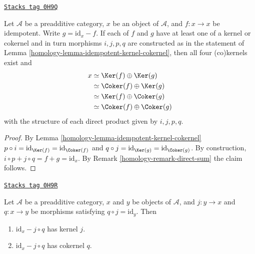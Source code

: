 \begin{lemma}
\label{homology-lemma-idempotent-splitting}
\href{https://stacks.math.columbia.edu/tag/0H9Q}{\texttt{Stacks tag 0H9Q}}

Let $\mathcal{A}$ be a preadditive category,
$x$ be an object of $\mathcal{A}$,
and $f : x \to x$ be idempotent.
Write $g = \text{id} _ x - f$.
If each of $f$ and $g$ have at least one of a kernel or cokernel
and in turn morphisms $i , j , p , q$ are constructed
as in the statement of Lemma \ref{homology-lemma-idempotent-kernel-cokernel},
then all four (co)kernels exist and
\begin{align*}
x
& \simeq \Ker (f) \oplus \Ker (g) \\
& \simeq \Coker (f) \oplus \Ker (g) \\
& \simeq \Ker (f) \oplus \Coker (g) \\
& \simeq \Coker (f) \oplus \Coker (g)
\end{align*}
with the structure of each direct product given by $i , j , p , q$.
\end{lemma}

\begin{proof}

By Lemma \ref{homology-lemma-idempotent-kernel-cokernel}
$p \circ i = \text{id} _ {\Ker (f)} = \text{id} _ {\Coker (f)}$
and $q \circ j = \text{id} _ {\Ker (g)} = \text{id} _ {\Coker (g)}$.
By construction, $i \circ p + j \circ q = f + g = \text{id} _ x$.
By Remark \ref{homology-remark-direct-sum} the claim follows.
\end{proof}

\begin{lemma}
\label{homology-lemma-split-morphism-kernel-cokernel}
\href{https://stacks.math.columbia.edu/tag/0H9R}{\texttt{Stacks tag 0H9R}}

Let $\mathcal{A}$ be a preadditive category,
$x$ and $y$ be objects of $\mathcal{A}$,
and $j : y \to x$ and $q : x \to y$ be morphisms
satisfying $q \circ j = \text{id} _ y$.
Then
\begin{enumerate}
\item $\text{id} _ x - j \circ q$ has kernel $j$.
\item $\text{id} _ x - j \circ q$ has cokernel $q$.
\end{enumerate}
\end{lemma}

